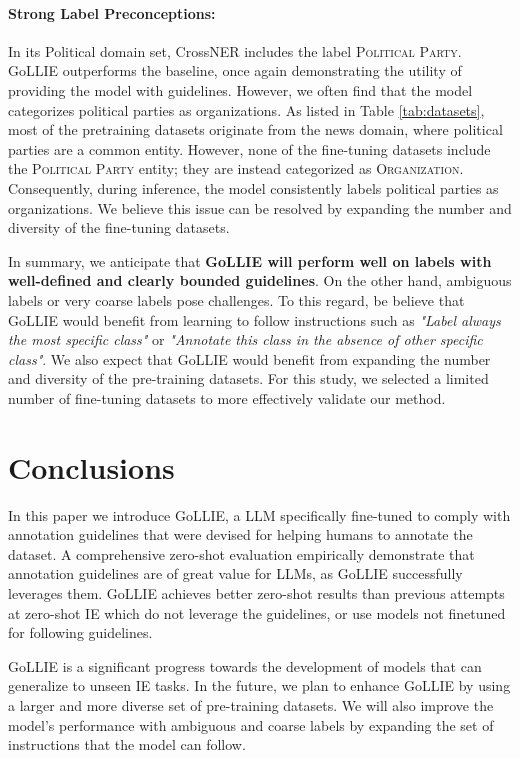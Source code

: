 \documentclass{article} \usepackage{iclr2024_conference,times}
\newcommand{\GoLLIET}{\scalerel*{\texttt{[image: logo/GoLLIE.pdf]}}{\textrm{\textbigcircle}} GoLLIE}
\begin{document}
\paragraph{Strong Label Preconceptions:} In its Political domain set, CrossNER includes the label \textsc{Political Party}. GoLLIE outperforms the baseline, once again demonstrating the utility of providing the model with guidelines. However, we often find that the model categorizes political parties as organizations. As listed in Table \ref{tab:datasets}, most of the pretraining datasets originate from the news domain, where political parties are a common entity. However, none of the fine-tuning datasets include the \textsc{Political Party} entity; they are instead categorized as \textsc{Organization}. Consequently, during inference, the model consistently labels political parties as organizations. We believe this issue can be resolved by expanding the number and diversity of the fine-tuning datasets.

In summary, we anticipate that \textbf{GoLLIE will perform well on labels with well-defined and clearly bounded guidelines}. On the other hand, ambiguous labels or very coarse labels pose challenges. To this regard, be believe that GoLLIE would benefit from learning to follow instructions such as \textit{"Label always the most specific class"} or \textit{"Annotate this class in the absence of other specific class"}. We also expect that GoLLIE would benefit from expanding the number and diversity of the pre-training datasets. For this study, we selected a limited number of fine-tuning datasets to more effectively validate our method.






\section{Conclusions}
In this paper we introduce \GoLLIET, a LLM specifically fine-tuned to comply with annotation guidelines that were devised for helping humans to annotate the dataset. A comprehensive zero-shot evaluation empirically demonstrate that annotation guidelines are of great value for LLMs, as GoLLIE successfully leverages them. GoLLIE achieves better zero-shot results than previous attempts at zero-shot IE which do not leverage the guidelines, or use models not finetuned for following guidelines. 

GoLLIE is a significant progress towards the development of models that can generalize to unseen IE tasks. In the future, we plan to enhance GoLLIE by using a larger and more diverse set of pre-training datasets. We will also improve the model's performance with ambiguous and coarse labels by expanding the set of instructions that the model can follow. 
\end{document}
